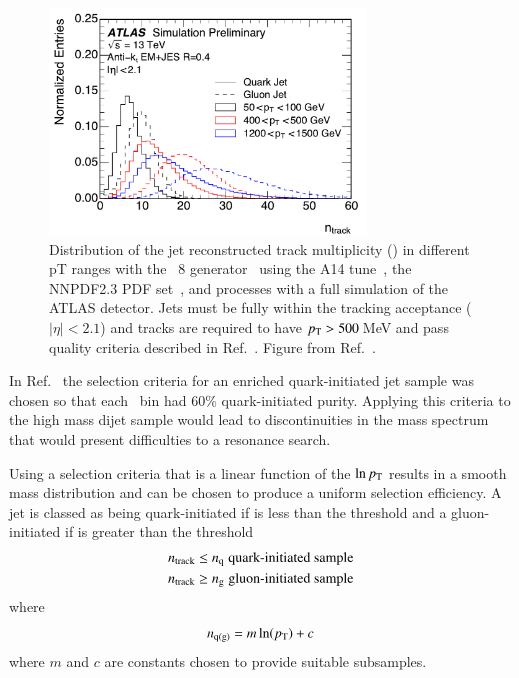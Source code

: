\begin{figure}[htb]
 \centering
\includegraphics[width=0.75\textwidth]{figures/tagging/fig_01_ATL-PHYS-PUB-2017-009.pdf}
\caption{Distribution of the jet reconstructed track multiplicity (\ntrk ) in
 different pT ranges with the \Pythia~8 generator~\cite{pythia8} using
 the A14 tune~\cite{A14tune}, the NNPDF2.3 PDF
 set~\cite{Carrazza:2013axa}, and processes with a full simulation of the
 ATLAS detector. Jets must be fully within the tracking acceptance
 ($|\eta|<2.1$) and tracks are required to have $p_{\mathrm T} > 500$\,MeV and pass
  quality criteria described in Ref.~\cite{ATL-PHYS-PUB-2017-009}. Figure
 from Ref.~\cite{ATL-PHYS-PUB-2017-009}. \label{fig:jet_pt_quark_gluon}}
\end{figure}

In Ref.~\cite{ATL-PHYS-PUB-2017-009}  the selection criteria for  an
enriched quark-initiated jet sample was chosen so that each \pT\ bin had
60\% quark-initiated purity. Applying this criteria to the high mass
dijet sample would lead to discontinuities in the mass spectrum that
would present difficulties to a resonance search. 

Using a selection criteria that is a linear function of the \( \ln p_{\mathrm T} \) 
results in a smooth mass distribution and can be chosen to produce a uniform 
selection efficiency.  A jet is classed as being quark-initiated if \ntrk is less than
the threshold \nq and a gluon-initiated if \ntrk is greater than the threshold \ngluon  
\begin{align}
n_{\textrm{track}} & \le n_{\textrm{q}} \; \mbox{quark-initiated sample} \label{eq:QGselect} \\
n_{\textrm{track}}	  & \ge n_{\textrm{g}} \; \mbox{gluon-initiated sample} \nonumber
\end{align}
where   
\begin{equation}
n_{\mathrm{q(g)}} = {m \ln(p_{\mathrm T}) + c}  \label{eq:nqg2}
\end{equation}
where $m$ and $c$ are constants chosen to provide suitable subsamples.

